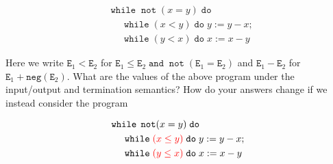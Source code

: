 \documentclass{article}
\newcommand{\E}{\mathtt{E}}
\newcommand{\andsym}{\mathtt{and}}
\newcommand{\notsym}{\mathop{\mathtt{not}}}
\newcommand{\whilesym}{\mathtt{while}}
\newcommand{\dosym}{\mathtt{do}}
\newcommand{\negation}{\mathtt{neg}}
\begin{document}
\begin{enumerate}
{\begin{align*}
& \whilesym \; \notsym(x = y) \; \dosym \\
& \;\;\;\;\; \whilesym \; (x < y) \; \dosym \; y := y - x; \\
& \;\;\;\;\; \whilesym \; (y < x) \; \dosym \; x := x - y
\end{align*}

Here we write $\E_1 < \E_2$ for $\E_1 \leq \E_2 \; \andsym \; \notsym(\E_1 = \E_2)$ and $\E_1 - \E_2$ for $\E_1 + \negation(\E_2)$. 
What are the values of the above program under the input/output and termination semantics? 
How do your answers change if we instead consider the program

\begin{align*}
& \whilesym \; \notsym(x = y) \; \dosym \\
& \;\;\;\;\; \whilesym \; {\color{red} (x \leq y)} \; \dosym \; y := y - x; \\
& \;\;\;\;\; \whilesym \; {\color{red} (y \leq x)} \; \dosym \; x := x - y
\end{align*}
}

\end{enumerate}
\end{document}
